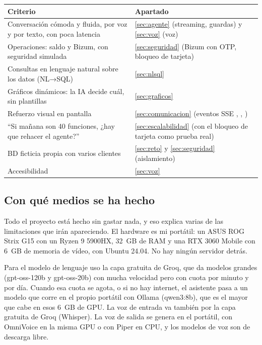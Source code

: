{\small
\begin{tabularx}{\textwidth}{@{}LP{5.2cm}@{}}
\toprule
\textbf{Criterio} & \textbf{Apartado} \\
\midrule
Conversación cómoda y fluida, por voz y por texto, con poca latencia & \ref{sec:agente} (streaming, guardas) y \ref{sec:voz} (voz) \\
Operaciones: saldo y Bizum, con seguridad simulada & \ref{sec:seguridad} (Bizum con OTP, bloqueo de tarjeta) \\
Consultas en lenguaje natural sobre los datos (NL→SQL) & \ref{sec:nlsql} \\
Gráficos dinámicos: la IA decide cuál, sin plantillas & \ref{sec:graficos} \\
Refuerzo visual en pantalla & \ref{sec:comunicacion} (eventos SSE , , ) \\
``Si mañana son 40 funciones, ¿hay que rehacer el agente?'' & \ref{sec:escalabilidad} (con el bloqueo de tarjeta como prueba real) \\
BD ficticia propia con varios clientes & \ref{sec:reto} y \ref{sec:seguridad} (aislamiento) \\
Accesibilidad & \ref{sec:voz} \\
\bottomrule
\end{tabularx}\par}

\subsection{Con qué medios se ha hecho}\label{sec:medios}

Todo el proyecto está hecho sin gastar nada, y eso explica varias de las limitaciones que irán apareciendo. El
hardware es mi portátil: un ASUS ROG Strix G15 con un Ryzen 9 5900HX, 32~GB de RAM y una RTX 3060 Mobile con 6~GB
de memoria de vídeo, con Ubuntu 24.04. No hay ningún servidor detrás.

Para el modelo de lenguaje uso la capa gratuita de Groq, que da modelos grandes (gpt-oss-120b y gpt-oss-20b) con mucha
velocidad pero con cuota por minuto y por día. Cuando esa cuota se agota, o si no hay internet, el asistente pasa a un
modelo que corre en el propio portátil con Ollama (qwen3:8b), que es el mayor que cabe en esos 6~GB de GPU. La voz de
entrada va también por la capa gratuita de Groq (Whisper). La voz de salida se genera en el portátil, con OmniVoice en
la misma GPU o con Piper en CPU, y los modelos de voz son de descarga libre.

